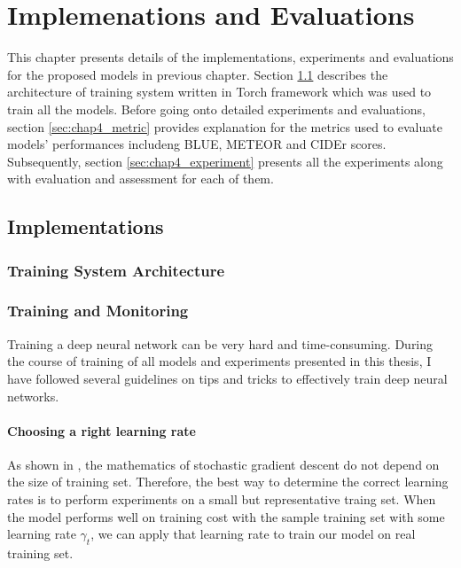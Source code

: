 \chapter{Implemenations and Evaluations}

This chapter presents details of the implementations, experiments and evaluations for the proposed models in previous chapter. Section \ref{sec:chap4_implementation} describes the architecture of training system written in Torch framework which was used to train all the models. Before going onto detailed experiments and evaluations, section \ref{sec:chap4_metric} provides explanation for the metrics used to evaluate models' performances includeng BLUE, METEOR and CIDEr scores. Subsequently, section \ref{sec:chap4_experiment} presents all the experiments along with evaluation and assessment for each of them.

\section{Implementations}
\label{sec:chap4_implementation}


\subsection{Training System Architecture}

\subsection{Training and Monitoring}
Training a deep neural network can be very hard and time-consuming. During the course of training of all models and experiments presented in this thesis, I have followed several guidelines \cite{bottou-tricks-2012} on tips and tricks to effectively train deep neural networks.
	
	\subsubsection{Choosing a right learning rate}
	As shown in \cite{Murata98astatistical}, the mathematics of stochastic gradient descent do not depend on the size of training set. Therefore, the best way to determine the correct learning rates is to perform experiments on a small but representative traing set. When the model performs well on training cost with the sample training set with some learning rate $\gamma_t$, we can apply that learning rate to train our model on real training set.


